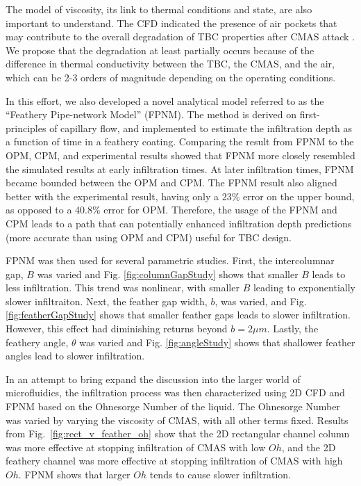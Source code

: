\documentclass{UCF_ETD}
\begin{document}
The model of viscosity, its link to thermal conditions and state, are also important to understand. The CFD indicated the presence of air pockets that may contribute to the overall degradation of TBC properties after CMAS attack \cite{Naraparaju2014,Naraparaju2017, Naraparaju2019}. 
We propose that the degradation at least partially occurs because of the difference in thermal conductivity between the TBC, the CMAS, and the air, which can be 2-3 orders of magnitude depending on the operating conditions. 

In this effort, we also developed a novel analytical model referred to as the ``Feathery Pipe-network Model'' (FPNM). The method is derived on first-principles of capillary flow, and implemented to estimate the infiltration depth as a function of time in a feathery coating.
Comparing the result from FPNM to the OPM, CPM, and experimental results showed that FPNM more closely resembled the simulated results at early infiltration times.
At later infiltration times, FPNM became bounded between the OPM and CPM. 
The FPNM result also aligned better with the experimental result, having only a 23\% error on the upper bound, as opposed to a 40.8\% error for OPM. 
Therefore, the usage of the FPNM and CPM leads to a path that can potentially enhanced infiltration depth predictions (more accurate than using OPM and CPM) useful for TBC design. 

FPNM was then used for several parametric studies. First, the intercolumnar gap, $B$ was varied and Fig. \ref{fig:columnGapStudy} shows that smaller $B$ leads to less infiltration. This trend was nonlinear, with smaller $B$ leading to exponentially slower infiltraiton. Next, the feather gap width, $b$, was varied, and Fig. \ref{fig:featherGapStudy} shows that smaller feather gaps leads to slower infiltration. However, this effect had diminishing returns beyond $b = 2 \mu m$. Lastly, the feathery angle, $\theta$ was varied and Fig. \ref{fig:angleStudy} shows that shallower feather angles lead to slower infiltration.


In an attempt to bring expand the discussion into the larger world of microfluidics, the infiltration process was then characterized using 2D CFD and FPNM based on the Ohnesorge Number of the liquid. 
The Ohnesorge Number was varied by varying the viscosity of CMAS, with all other terms fixed. 
Results from Fig.~\ref{fig:rect_v_feather_oh} show that the 2D rectangular channel column was more effective at stopping infiltration of CMAS with low $Oh$, and the 2D feathery channel was more effective at stopping infiltration of CMAS with high $Oh$. 
FPNM shows that larger $Oh$ tends to cause slower infiltration.
\end{document}
